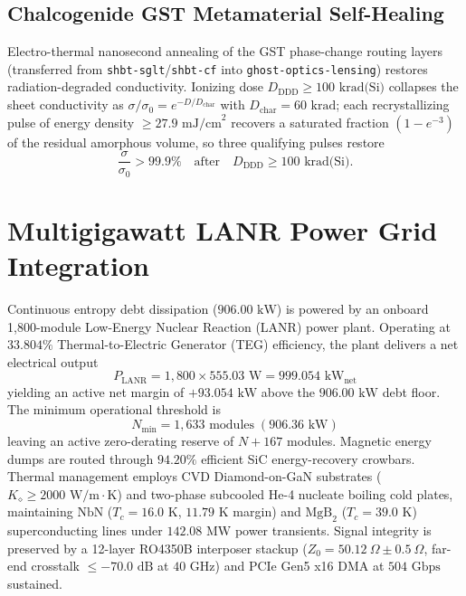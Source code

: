 \documentclass[twocolumn,aps,pra,floatfix,superscriptaddress,10pt]{revtex4-2}
\begin{document}
\subsection{Chalcogenide GST Metamaterial Self-Healing}

Electro-thermal nanosecond annealing of the GST phase-change routing layers (transferred from \texttt{shbt-sglt}/\texttt{shbt-cf} into \texttt{ghost-optics-lensing}) restores radiation-degraded conductivity. Ionizing dose $D_{\text{DDD}} \ge 100\text{ krad(Si)}$ collapses the sheet conductivity as $\sigma/\sigma_0 = e^{-D/D_{\text{char}}}$ with $D_{\text{char}} = 60\text{ krad}$; each recrystallizing pulse of energy density $\ge 27.9\text{ mJ/cm}^2$ recovers a saturated fraction $(1-e^{-3})$ of the residual amorphous volume, so three qualifying pulses restore
\begin{equation}
\frac{\sigma}{\sigma_0} > 99.9\% \quad \text{after} \quad D_{\text{DDD}} \ge 100\text{ krad(Si)} .
\end{equation}

\section{Multigigawatt LANR Power Grid Integration}

Continuous entropy debt dissipation ($906.00\text{ kW}$) is powered by an onboard 1,800-module Low-Energy Nuclear Reaction (LANR) power plant. Operating at $33.804\%$ Thermal-to-Electric Generator (TEG) efficiency, the plant delivers a net electrical output
\begin{equation}
P_{\text{LANR}} = 1{,}800 \times 555.03\text{ W} = 999.054\text{ kW}_{\text{net}}
\end{equation}
yielding an active net margin of $+93.054\text{ kW}$ above the $906.00\text{ kW}$ debt floor. The minimum operational threshold is
\begin{equation}
N_{\min} = 1{,}633\text{ modules} \; (906.36\text{ kW})
\end{equation}
leaving an active zero-derating reserve of $N+167$ modules. Magnetic energy dumps are routed through $94.20\%$ efficient SiC energy-recovery crowbars. Thermal management employs CVD Diamond-on-GaN substrates ($K_\diamond \ge 2000\text{ W/m}\cdot\text{K}$) and two-phase subcooled He-4 nucleate boiling cold plates, maintaining $\mathrm{NbN}$ ($T_c = 16.0\text{ K}$, $11.79\text{ K}$ margin) and $\mathrm{MgB}_2$ ($T_c = 39.0\text{ K}$) superconducting lines under $142.08\text{ MW}$ power transients. Signal integrity is preserved by a 12-layer RO4350B interposer stackup ($Z_0 = 50.12\ \Omega \pm 0.5\ \Omega$, far-end crosstalk $\le -70.0\text{ dB}$ at $40\text{ GHz}$) and PCIe Gen5 x16 DMA at $504\text{ Gbps}$ sustained.
\end{document}
